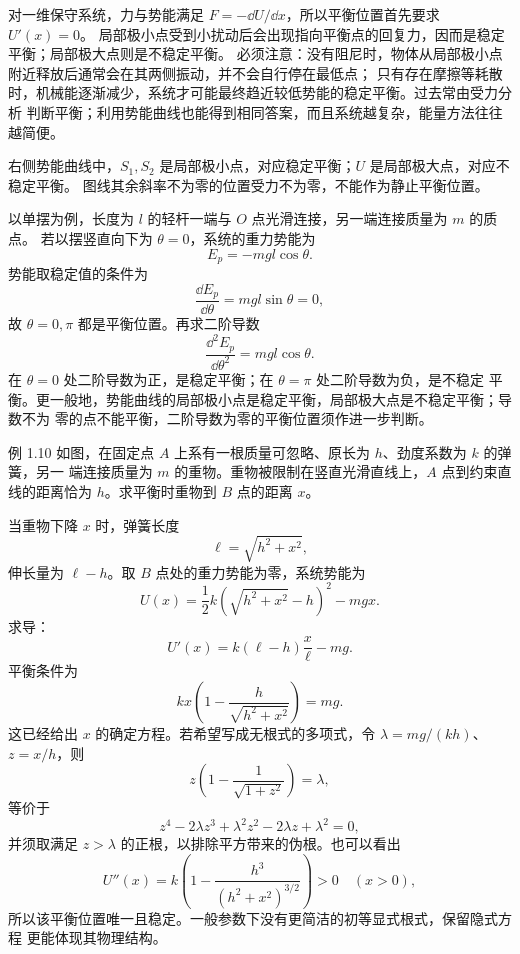 对一维保守系统，力与势能满足 $F=-\dd U/\dd x$，所以平衡位置首先要求 $U'(x)=0$。
局部极小点受到小扰动后会出现指向平衡点的回复力，因而是稳定平衡；局部极大点则是不稳定平衡。
必须注意：没有阻尼时，物体从局部极小点附近释放后通常会在其两侧振动，并不会自行停在最低点；
只有存在摩擦等耗散时，机械能逐渐减少，系统才可能最终趋近较低势能的稳定平衡。过去常由受力分析
判断平衡；利用势能曲线也能得到相同答案，而且系统越复杂，能量方法往往越简便。

\potentialDiagram

右侧势能曲线中，$S_1,S_2$ 是局部极小点，对应稳定平衡；$U$ 是局部极大点，对应不稳定平衡。
图线其余斜率不为零的位置受力不为零，不能作为静止平衡位置。

以单摆为例，长度为 $l$ 的轻杆一端与 $O$ 点光滑连接，另一端连接质量为 $m$ 的质点。
若以摆竖直向下为 $\theta=0$，系统的重力势能为
\begin{equation}
 E_p=-mgl\cos\theta.
\end{equation}
势能取稳定值的条件为
\begin{equation}
 \frac{\dd E_p}{\dd\theta}=mgl\sin\theta=0,
\end{equation}
故 $\theta=0,\pi$ 都是平衡位置。再求二阶导数
\begin{equation}
 \frac{\dd^2E_p}{\dd\theta^2}=mgl\cos\theta.
\end{equation}
在 $\theta=0$ 处二阶导数为正，是稳定平衡；在 $\theta=\pi$ 处二阶导数为负，是不稳定
平衡。更一般地，势能曲线的局部极小点是稳定平衡，局部极大点是不稳定平衡；导数不为
零的点不能平衡，二阶导数为零的平衡位置须作进一步判断。

\Needspace{0.37\textheight}
\begin{origexamplebox}{例 1.10}
如图，在固定点 $A$ 上系有一根质量可忽略、原长为 $h$、劲度系数为 $k$ 的弹簧，另一
端连接质量为 $m$ 的重物。重物被限制在竖直光滑直线上，$A$ 点到约束直线的距离恰为
$h$。求平衡时重物到 $B$ 点的距离 $x$。
\probdiagOneTen
\end{origexamplebox}

\begin{xesolution}
当重物下降 $x$ 时，弹簧长度
\[
 \ell=\sqrt{h^2+x^2},
\]
伸长量为 $\ell-h$。取 $B$ 点处的重力势能为零，系统势能为
\[
 U(x)=\frac12k(\sqrt{h^2+x^2}-h)^2-mgx.
\]
求导：
\[
 U'(x)=k(\ell-h)\frac{x}{\ell}-mg.
\]
平衡条件为
\[
 \boxed{kx\left(1-\frac{h}{\sqrt{h^2+x^2}}\right)=mg}.
\]
这已经给出 $x$ 的确定方程。若希望写成无根式的多项式，令
$\lambda=mg/(kh)$、$z=x/h$，则
\[
 z\left(1-\frac1{\sqrt{1+z^2}}\right)=\lambda,
\]
等价于
\[
 \boxed{z^4-2\lambda z^3+\lambda^2z^2-2\lambda z+\lambda^2=0},
\]
并须取满足 $z>\lambda$ 的正根，以排除平方带来的伪根。也可以看出
\[
 U''(x)=k\left(1-\frac{h^3}{(h^2+x^2)^{3/2}}\right)>0\quad(x>0),
\]
所以该平衡位置唯一且稳定。一般参数下没有更简洁的初等显式根式，保留隐式方程
更能体现其物理结构。
\end{xesolution}

